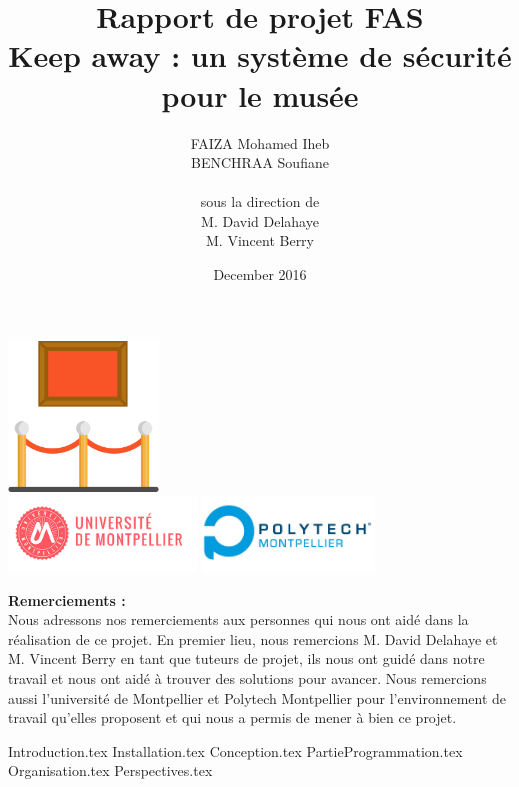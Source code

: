 \documentclass{article}
\title{Rapport de projet FAS \\ \textbf{Keep away : un système de sécurité\\ pour le musée}}
\author{FAIZA Mohamed Iheb\\ BENCHRAA Soufiane\\\\ {\small sous la direction de}\\ M. David Delahaye\\ M. Vincent Berry}
\date{December 2016}
\begin{document}
\begin{titlepage}
\maketitle
\begin{center}
\includegraphics[height=4cm]{museum-1.png}\\
\includegraphics[height=2cm]{logoum2.png}
\includegraphics[height=2cm]{logopolytech.png}
\end{center}
\end{titlepage}

\tableofcontents
\clearpage

\textbf{\LARGE Remerciements :}\\
Nous adressons nos remerciements aux personnes qui nous ont aidé dans la réalisation de ce projet.
En premier lieu, nous remercions M. David Delahaye et M. Vincent Berry en tant que tuteurs de projet, ils nous ont guidé dans notre travail et nous ont aidé à trouver des solutions pour avancer.
Nous remercions aussi l'université de Montpellier et Polytech Montpellier pour l'environnement de travail qu'elles proposent et qui nous a permis de mener à bien ce projet.

\clearpage


{Introduction.tex}
{Installation.tex}
{Conception.tex}
{PartieProgrammation.tex}
{Organisation.tex}
{Perspectives.tex}
\end{document}
